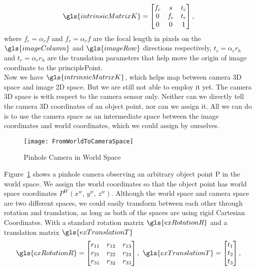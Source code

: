 \begin{equation}
\gls{intrinsicMatrixK}%
=  \begin{bmatrix} 
f_c & s & t_c \\
 0 & f_r & t_r \\
 0 & 0 & 1 \end{bmatrix} ,%
\label{intrinsicKmatrix}
\end{equation}%
\noindent
where \(f_c = \alpha_c f\) and \(f_r = \alpha_r f\) are the focal length in pixels on the \(\gls{imageColumn}\) and \(\gls{imageRow}\) directions respectively,  \(t_c = \alpha_c r_h\) and \(t_r = \alpha_r r_h\) are the translation parameters that help move the origin of image coordinate to the \gls{principlePoint}.
\\\indent
Now we have \(\gls{intrinsicMatrixK}\), which helps map between camera \gls{3D} space and image 2D space. But we are still not able to employ it yet. The camera \gls{3D} space is with respect to the camera sensor only. Neither can we directly tell the camera \gls{3D} coordinates of an object point, nor can we assign it. All we can do is to use the camera space as an intermediate space between the image coordinates and world coordinates, which we could assign by ourselves. %
%
\begin{figure}[!t]
\centering
\texttt{[image: FromWorldToCameraSpace]}
\caption{Pinhole Camera in World Space}
\label{FromWorldToCameraSpace}
\end{figure}%
%
Figure~\ref{FromWorldToCameraSpace} shows a pinhole camera observing an arbitrary object point P in the world  space. We assign the world coordinates so that the object point has world space coordinates \(P^W(x^w, \, y^w, \, z^w)\). Although the world space and camera space are two different spaces, we could easily transform between each other through rotation and translation, as long as both of the spaces are using rigid Cartesian Coordinates. With a standard rotation matrix \(\gls{exRotationR}\) and a translation matrix \(\gls{exTranslationT}\)
%
\begin{equation}
\gls{exRotationR}%
=  \begin{bmatrix} 
r_{11} & r_{12} & r_{13} \\
r_{21} & r_{22} & r_{23} \\
r_{31} & r_{32} & r_{33}
 \end{bmatrix}%
, \, \, 
\gls{exTranslationT}%
=  \begin{bmatrix} 
t_{1} \\
t_{2} \\
t_{3}
 \end{bmatrix} ,%
\label{rotationTranslationMatrixRT}
\end{equation}%
